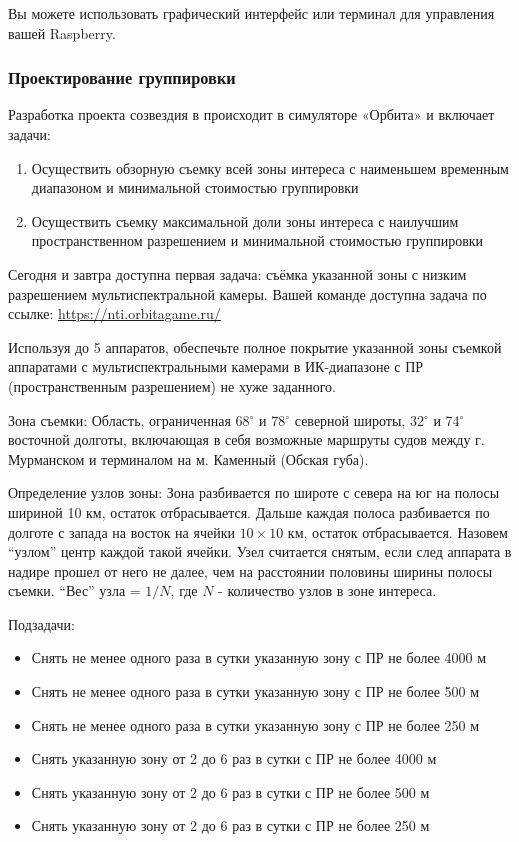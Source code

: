 Вы можете использовать графический интерфейс или терминал для управления вашей Raspberry.

\subsubsection*{Проектирование группировки}

Разработка проекта созвездия в происходит в симуляторе «Орбита» и включает задачи:
\begin{enumerate}
    \item Осуществить обзорную съемку всей зоны интереса с наименьшем временным диапазоном и минимальной стоимостью группировки
    \item Осуществить съемку максимальной доли зоны интереса с наилучшим пространственном разрешением и минимальной стоимостью группировки
\end{enumerate}

Сегодня и завтра доступна первая задача: съёмка указанной зоны с низким разрешением мультиспектральной камеры. Вашей команде доступна задача по ссылке: \url{https://nti.orbitagame.ru/}

Используя до 5 аппаратов, обеспечьте полное покрытие указанной зоны съемкой аппаратами с мультиспектральными камерами в ИК-диапазоне с ПР (пространственным разрешением) не хуже заданного.

Зона съемки: Область, ограниченная 68$^\circ$ и 78$^\circ$ северной широты, 32$^\circ$ и 74$^\circ$ восточной долготы, включающая в себя возможные маршруты судов между г. Мурманском и терминалом на м. Каменный (Обская губа).

Определение узлов зоны: Зона разбивается по широте с севера на юг на полосы шириной 10 км, остаток отбрасывается. Дальше каждая полоса разбивается по долготе с запада на восток на ячейки $10 \times 10$ км, остаток отбрасывается. Назовем “узлом” центр каждой такой ячейки. Узел считается снятым, если след аппарата в надире прошел от него не далее, чем на расстоянии половины ширины полосы съемки. “Вес” узла = $1/N$, где $N$ - количество узлов в зоне интереса.

Подзадачи:
\begin{itemize}
    \item Снять не менее одного раза в сутки указанную зону с ПР не более 4000 м
    \item Снять не менее одного раза в сутки указанную зону с ПР не более 500 м
    \item Снять не менее одного раза в сутки указанную зону с ПР не более 250 м
    \item Снять указанную зону от 2 до 6 раз в сутки с ПР не более 4000 м
    \item Снять указанную зону от 2 до 6 раз в сутки с ПР не более 500 м
    \item Снять указанную зону от 2 до 6 раз в сутки с ПР не более 250 м
\end{itemize}

